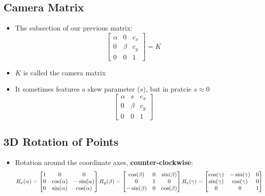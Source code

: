 \subsection{Camera Matrix}
\begin{itemize}
	\item The subsection of our previous matrix:
	$$\begin{bmatrix}
		\alpha & 0 & c_x \\
		0 & \beta & c_y \\
		0 & 0 & 1 
	\end{bmatrix}=K$$
	\item $K$ is called the camera matrix
	\item It sometimes features a skew parameter ($s$), but in pratcie $s\approx 0$
		$$\begin{bmatrix}
		\alpha & s & c_x \\
		0 & \beta & c_y \\
		0 & 0 & 1 
	\end{bmatrix}$$
\end{itemize}

\subsection{3D Rotation of Points}
\begin{itemize}
	\item Rotation around the coordinate axes, \textbf{counter-clockwise}:
	$$R_x(\alpha)=\begin{bmatrix}
		1 & 0 & 0 \\
		0 & \cos(\alpha) & -\sin(\alpha) \\
		0 & \sin(\alpha) & \cos(\alpha)
	\end{bmatrix}\\
	R_y(\beta)=\begin{bmatrix}
		\cos(\beta) & 0 & \sin(\beta) \\
		0 & 1 & 0 \\
		-\sin(\beta) & 0 & \cos(\beta)
	\end{bmatrix}\\
	R_z(\gamma)=\begin{bmatrix}
		\cos(\gamma) & -\sin(\gamma) & 0 \\
		\sin(\gamma) & \cos(\gamma) & 0 \\
		0 & 0 & 1
	\end{bmatrix}$$
\end{itemize}

